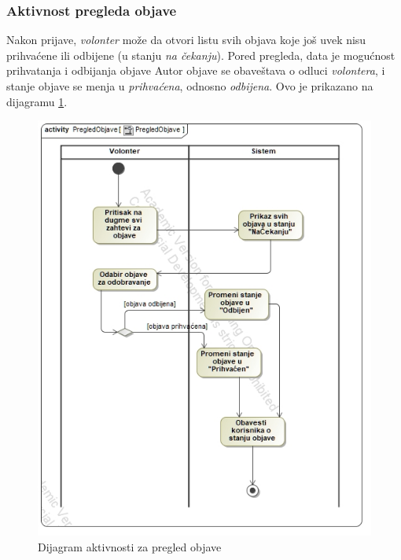 \subsubsection*{Aktivnost pregleda objave}
\par Nakon prijave, \textit{volonter} može da otvori listu svih objava koje još uvek nisu prihvaćene ili odbijene (u stanju \textit{na čekanju}). Pored pregleda,
data je mogućnost prihvatanja i odbijanja objave Autor objave se obaveštava o odluci \textit{volontera}, i stanje objave se menja u \textit{prihvaćena}, odnosno
\textit{odbijena}. Ovo je prikazano na dijagramu \ref{fig:activity-post-review}.
\begin{figure}[h]
    \centering
    \includegraphics[width=\textwidth, height=\textwidth]{img/activity-post-review.jpg}
    \caption{Dijagram aktivnosti za pregled objave}
    \label{fig:activity-post-review}
\end{figure}
